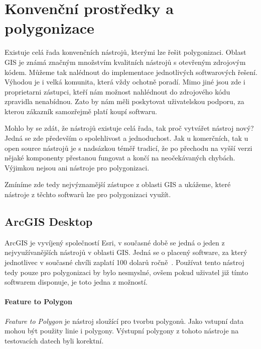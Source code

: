 \chapter{Konvenční prostředky a polygonizace}
\label{chap:konvencni prostredky a polygonizace}
Existuje celá řada konvenčních nástrojů, kterými lze řešit
polygonizaci. Oblast GIS je známá značným množstvím kvalitních
nástrojů s otevřeným zdrojovým kódem. Můžeme tak nalédnout do
implementace jednotlivých softwarových řešení. Výhodou je i velká
komunita, která vždy ochotně poradí. Mimo jiné jsou zde i proprietarni
zástupci, kteří nám možnost nahlédnout do zdrojového kódu zpravidla
nenabídnou. Zato by nám měli poskytovat uživatelskou podporu, za
kterou zákazník samozřejmě platí koupí softwaru.
	
Mohlo by se zdát, že nástrojů existuje celá řada, tak proč vytvářet
nástroj nový? Jedná se zde především o spolehlivost a
jednoduchost. Jak u komerčních, tak u open source nástrojů je s
nadsázkou téměř tradicí, že po přechodu na vyšší verzi nějaké
komponenty přestanou fungovat a končí na neočekávaných
chybách. Výjimkou nejsou ani nástroje pro polygonizaci.
	
Zmíníme zde tedy nejvýznamější zástupce z oblasti GIS a ukážeme, které
nástroje z těchto softwarů lze pro polygonizaci využít.
	
\section{ArcGIS Desktop}
ArcGIS je vyvíjený společností Esri, v současné době se jedná o jeden
z nejvyužívanějších nástrojů v oblasti GIS. Jedná se o placený
software, za který jednotlivec v současné chvíli zaplatí 100
dolarů ročně~\cite{esri}. Používat tento nástroj tedy pouze pro polygonizaci by
bylo nesmyslné, ovšem pokud uživatel již tímto softwarem disponuje, je
toto jedna z možností.
	
\subsubsection{Feature to Polygon}
\textit{Feature to Polygon} je nástroj sloužící pro tvorbu
polygonů. Jako vstupní data mohou být použity linie i
polygony. Výstupní polygony z tohoto nástroje na testovacích datech
byli korektní.

